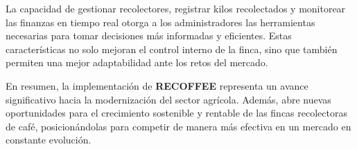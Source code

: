 \documentclass[a4paper,12pt]{article}
\begin{document}
La capacidad de gestionar recolectores, registrar kilos recolectados y monitorear las finanzas en tiempo real otorga a los administradores las herramientas necesarias para tomar decisiones más informadas y eficientes. Estas características no solo mejoran el control interno de la finca, sino que también permiten una mejor adaptabilidad ante los retos del mercado.

En resumen, la implementación de \textbf{RECOFFEE} representa un avance significativo hacia la modernización del sector agrícola. Además, abre nuevas oportunidades para el crecimiento sostenible y rentable de las fincas recolectoras de café, posicionándolas para competir de manera más efectiva en un mercado en constante evolución.
\end{document}
